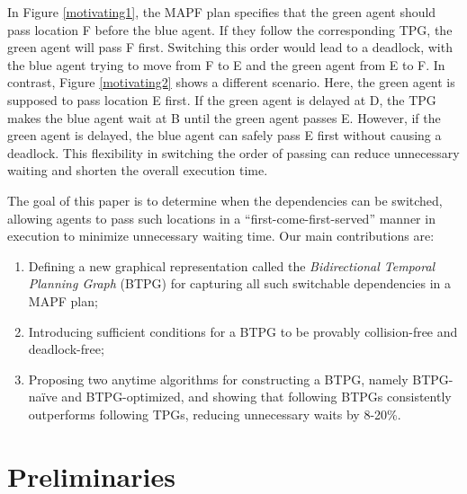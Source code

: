 \documentclass[letterpaper]{article} %
\theoremstyle{definition}
\newcommand{\rishi}[1]{\textcolor{black}{\textbf{Rishi:}} 
\textcolor{purple}{#1}}
\newcommand{\andrew}[1]{\textcolor{black}{\textbf{Yifan:}} \textcolor{blue}{#1}}
\begin{document}
In Figure \ref{motivating1}, the MAPF plan specifies that the green agent should pass location F before the blue agent. If they follow the corresponding TPG, the green agent will pass F first. Switching this order would lead to a deadlock, with the blue agent trying to move from F to E and the green agent from E to F.
In contrast, Figure \ref{motivating2} shows a different scenario. Here, the green agent is supposed to pass location E first. If the green agent is delayed at D, the TPG makes the blue agent wait at B until the green agent passes E. However, if the green agent is delayed, the blue agent can safely pass E first without causing a deadlock. This flexibility in switching the order of passing can reduce unnecessary waiting and shorten the overall execution time.


The goal of this paper is to determine when the dependencies can be switched, allowing agents to pass such locations in a ``first-come-first-served'' manner in execution to minimize unnecessary waiting time.  Our main contributions are:
\begin{enumerate}
    \item Defining a new graphical representation called the \emph{Bidirectional Temporal Planning Graph} (BTPG) for capturing all such switchable dependencies in a MAPF plan;
    \item Introducing sufficient conditions for a BTPG to be provably collision-free and deadlock-free;
    \item Proposing two anytime algorithms for constructing a BTPG, namely
    BTPG-naïve and BTPG-optimized, and showing that following BTPGs consistently outperforms following TPGs, reducing unnecessary waits by 8-20\%.
\end{enumerate}



\section{Preliminaries}
\end{document}

